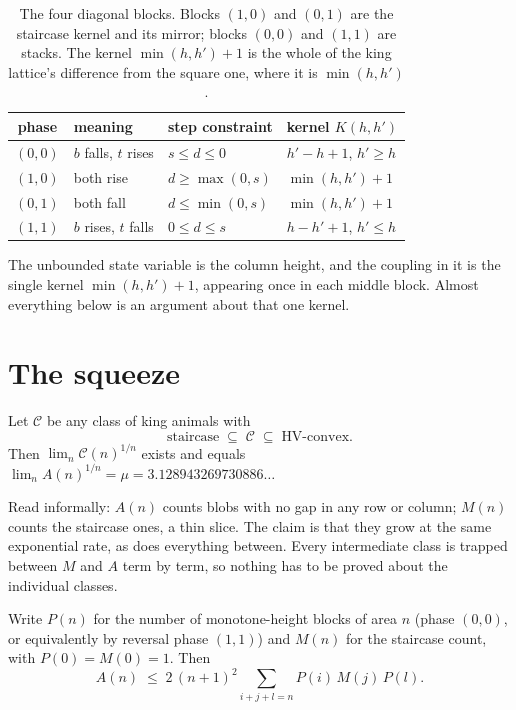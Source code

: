 \documentclass[11pt]{article}
\begin{document}
\begin{table}[H]
\centering\small
\begin{tabular}{c l l l}
\toprule
phase & meaning & step constraint & kernel $K(h,h')$ \\
\midrule
$(0,0)$ & $b$ falls, $t$ rises & $s \le d \le 0$ & $h'-h+1$, \; $h' \ge h$ \\
$(1,0)$ & both rise & $d \ge \max(0,s)$ & $\min(h,h')+1$ \\
$(0,1)$ & both fall & $d \le \min(0,s)$ & $\min(h,h')+1$ \\
$(1,1)$ & $b$ rises, $t$ falls & $0 \le d \le s$ & $h-h'+1$, \; $h' \le h$ \\
\bottomrule
\end{tabular}
\caption{The four diagonal blocks. Blocks $(1,0)$ and $(0,1)$ are the staircase
kernel and its mirror; blocks $(0,0)$ and $(1,1)$ are stacks. The kernel
$\min(h,h')+1$ is the whole of the king lattice's difference from the square
one, where it is $\min(h,h')$.}
\label{tab:blocks}
\end{table}

The unbounded state variable is the column height, and the coupling in it is
the single kernel $\min(h,h')+1$, appearing once in each middle block. Almost
everything below is an argument about that one kernel.

\section{The squeeze}
\label{sec:squeeze}

\begin{proposition}
\label{prop:squeeze}
Let $\mathcal C$ be any class of king animals with
\[
  \text{staircase} \;\subseteq\; \mathcal C \;\subseteq\; \text{HV-convex}.
\]
Then $\lim_n \mathcal C(n)^{1/n}$ exists and equals
$\lim_n A(n)^{1/n} = \mu = 3.128943269730886\dots$
\end{proposition}

Read informally: $A(n)$ counts blobs with no gap in any row or column; $M(n)$
counts the staircase ones, a thin slice. The claim is that they grow at the same
exponential rate, as does everything between. Every intermediate class is
trapped between $M$ and $A$ term by term, so nothing has to be proved about the individual classes.

\begin{lemma}
\label{lem:blocks}
Write $P(n)$ for the number of monotone-height blocks of area $n$ (phase
$(0,0)$, or equivalently by reversal phase $(1,1)$) and $M(n)$ for the staircase
count, with $P(0) = M(0) = 1$. Then
\begin{equation}
  A(n) \;\le\; 2\,(n{+}1)^2 \sum_{i+j+l=n} P(i)\,M(j)\,P(l) .
  \label{eq:factor}
\end{equation}
\end{lemma}
\end{document}
